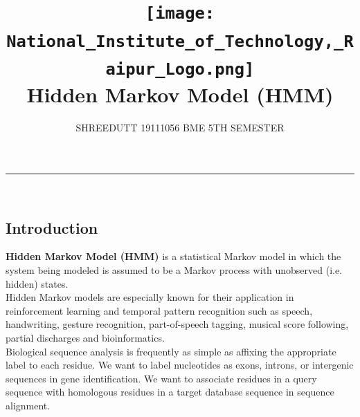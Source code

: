 \documentclass[12pt,letterpaper]{article}
\begin{document}
\title{
\texttt{[image: National\_Institute\_of\_Technology,\_Raipur\_Logo.png]}
\\ 
Hidden Markov Model (HMM)
}

\author{SHREEDUTT 19111056 BME 5TH SEMESTER}

\maketitle
\rule{\textwidth}{0.5pt}
\\
\subsection*{Introduction}
\textbf{Hidden Markov Model (HMM)} is a statistical Markov model in which the system being modeled is assumed to be a Markov process with unobserved (i.e. hidden) states.
\\
Hidden Markov models are especially known for their application in reinforcement learning and temporal pattern recognition such as speech, handwriting, gesture recognition, part-of-speech tagging, musical score following, partial discharges and bioinformatics.
\\
Biological sequence analysis is frequently as simple as affixing the appropriate label to each residue. We want to label nucleotides as exons, introns, or intergenic sequences in gene identification. We want to associate residues in a query sequence with homologous residues in a target database sequence in sequence alignment. 
\\
\\
\end{document}
